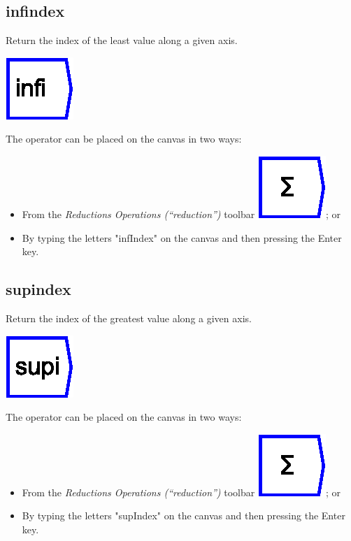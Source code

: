\subsection{infindex}

\label{Operation:infIndex} Return the index of the least value along
a given axis.

\includegraphics{images/infindex}

The operator can be placed on the canvas in two ways:
\begin{itemize}
\item From the \emph{Reductions Operations (``reduction'')} toolbar \includegraphics{images/sum};
or 
\item By typing the letters "infIndex" on the canvas and then pressing
the Enter key.
\end{itemize}

\subsection{supindex}

\label{Operation:supIndex} Return the index of the greatest value
along a given axis.

\includegraphics{images/supindex}

The operator can be placed on the canvas in two ways:
\begin{itemize}
\item From the \emph{Reductions Operations (``reduction'')} toolbar \includegraphics{images/sum};
or 
\item By typing the letters "supIndex" on the canvas and then pressing
the Enter key.
\end{itemize}

